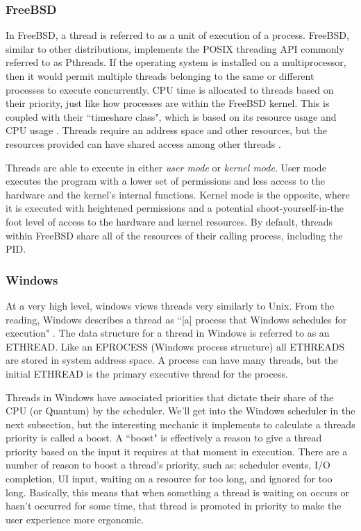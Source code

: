 \subsubsection{FreeBSD}
\label{sub:Thread FreeBSD}

\par In FreeBSD, a thread is referred to as a unit of execution of a process.
FreeBSD, similar to other distributions, implements the POSIX threading API commonly referred to as Pthreads.
If the operating system is installed on a multiprocessor, then it would permit multiple threads belonging to the same or different processes to execute concurrently.
CPU time is allocated to threads based on their priority, just like how processes are within the FreeBSD kernel.
This is coupled with their ``timeshare class", which is based on its resource usage and CPU usage \cite{bsd:1}.
Threads require an address space and other resources, but the resources provided can have shared access among other threads \cite{bsd:1}.

\par Threads are able to execute in either \textit{user mode} or \textit{kernel mode}.
User mode executes the program with a lower set of permissions and less access to the hardware and the kernel's internal functions.
Kernel mode is the opposite, where it is executed with heightened permissions and a potential shoot-yourself-in-the foot level of access to the hardware and kernel resources.
By default, threads within FreeBSD share all of the resources of their calling process, including the PID.

\subsubsection{Windows}
\label{sub:Thread Windows}

\par At a very high level, windows views threads very similarly to Unix.
From the reading, Windows describes a thread as ``[a] process that Windows schedules for execution" \cite{win:1}.
The data structure for a thread in Windows is referred to as an ETHREAD.
Like an EPROCESS (Windows process structure) all ETHREADS are stored in system address space.
A process can have many threads, but the initial ETHREAD is the primary executive thread for the process.

\par Threads in Windows have associated priorities that dictate their share of the CPU (or Quantum) by the scheduler.
We'll get into the Windows scheduler in the next subsection, but the interesting mechanic it implements to calculate a threads priority is called a boost.
A ``boost" is effectively a reason to give a thread priority based on the input it requires at that moment in execution.
There are a number of reason to boost a thread's priority, such as: scheduler events, I/O completion, UI input, waiting on a resource for too long, and ignored for too long.
Basically, this means that when something a thread is waiting on occurs or hasn't occurred for some time, that thread is promoted in priority to make the user experience more ergonomic.

